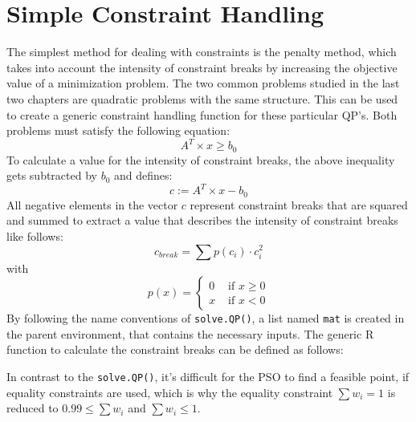 \documentclass[
  oneside]{book}
\newenvironment{Shaded}{\begin{snugshade}}{\end{snugshade}}
\newcommand{\ControlFlowTok}[1]{\textcolor[rgb]{0.13,0.29,0.53}{\textbf{#1}}}
\newcommand{\DecValTok}[1]{\textcolor[rgb]{0.00,0.00,0.81}{#1}}
\newcommand{\FunctionTok}[1]{\textcolor[rgb]{0.00,0.00,0.00}{#1}}
\newcommand{\NormalTok}[1]{#1}
\newcommand{\OtherTok}[1]{\textcolor[rgb]{0.56,0.35,0.01}{#1}}
\newcommand{\SpecialCharTok}[1]{\textcolor[rgb]{0.00,0.00,0.00}{#1}}
\begin{document}
\hypertarget{simple-constraint-handling}{%
\section{Simple Constraint Handling}\label{simple-constraint-handling}}

The simplest method for dealing with constraints is the penalty method, which takes into account the intensity of constraint breaks by increasing the objective value of a minimization problem. The two common problems studied in the last two chapters are quadratic problems with the same structure. This can be used to create a generic constraint handling function for these particular QP's. Both problems must satisfy the following equation:
\[
  A^T \times x  \geq b_0
\]
To calculate a value for the intensity of constraint breaks, the above inequality gets subtracted by \(b_0\) and defines:
\[
  c := A^T \times x - b_0
\]
All negative elements in the vector \(c\) represent constraint breaks that are squared and summed to extract a value that describes the intensity of constraint breaks like follows:
\[
  c_{break} = \sum p(c_i) \cdot c_i^2
\]
with
\[
 p(x) =   \begin{cases}
  0 &\text{ if }x \geq 0\\
  x &\text{ if }x < 0
  \end{cases}
\]
By following the name conventions of \texttt{solve.QP()}, a list named \texttt{mat} is created in the parent environment, that contains the necessary inputs. The generic R function to calculate the constraint breaks can be defined as follows:

\begin{Shaded}
\end{Shaded}

In contrast to the \texttt{solve.QP()}, it's difficult for the PSO to find a feasible point, if equality constraints are used, which is why the equality constraint \(\textstyle\sum w_i = 1\) is reduced to \(0.99 \leq \textstyle\sum w_i\) and \(\textstyle\sum w_i \leq 1\).
\end{document}
